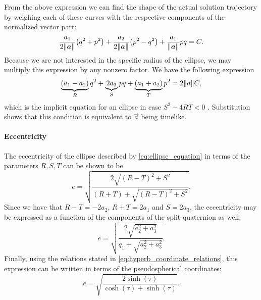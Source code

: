 From the above expression we can find the shape of the actual solution trajectory by weighing each of these curves with the respective components of the normalized vector part:
$$ \frac{a_1}{2\norm{\vec{a}}}\qty(q^2 + p^2)  + \frac{a_2}{2\norm{\vec{a}}}\qty(p^2 - q^2) + \frac{a_1}{\norm{\vec{a}}}pq = C. $$
Because we are not interested in the specific radius of the ellipse, we may multiply this expression by any nonzero factor. We have the following expression 
\begin{equation}
    \underbrace{(a_1 - a_2)}_{R} q^2 + \underbrace{2 a_3}_{S} pq + \underbrace{(a_1 + a_2)}_{T} p^2 = 2\norm{a}C,
    \label{eq:ellipse_equation}
\end{equation}
which is the implicit equation for an ellipse in case $S^2 - 4RT < 0$ \cite{Rapp1991}. Substitution shows that this condition is equivalent to $\vec{a}$ being timelike. 

\paragraph{Eccentricity} The eccentricity of the ellipse described by \cref{eq:ellipse_equation} in terms of the parameters $R, S, T$ can be shown to be \cite{Rapp1991}
\begin{equation}
    e = \sqrt{\frac{2\sqrt{(R - T)^2 + S^2}}{(R + T) + \sqrt{(R - T)^2 + S^2}}}.
    \label{eq:eccentricity}
\end{equation}
Since we have that $R - T = -2a_2$, $R + T = 2a_1$ and $S = 2a_3$, the eccentricity may be expressed as a function of the components of the split-quaternion as well:
\begin{equation}
    e = \sqrt{\frac{2\sqrt{a_2^2 + a_3^2}}{q_1 + \sqrt{a_2^2 + a_3^2}}}.
\end{equation}
Finally, using the relations stated in \cref{eq:hyperb_coordinate_relations}, this expression can be written in terms of the pseudospherical coordinates:
\begin{equation}
    e = \sqrt{\frac{2\sinh(\tau)}{\cosh(\tau) + \sinh(\tau)}}. 
    \label{eq:e_pseudosphere_coords}
\end{equation}

